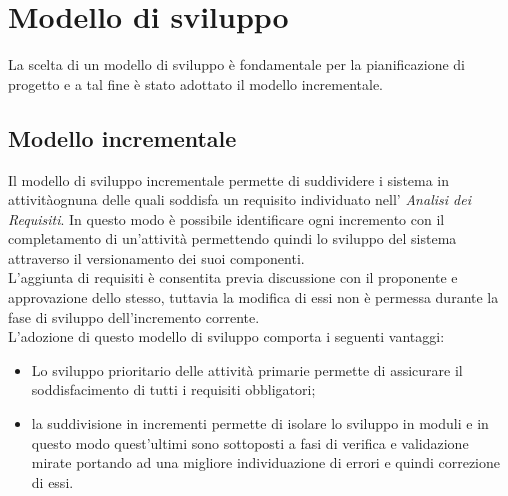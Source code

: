 \section{Modello di sviluppo}
La scelta di un modello di sviluppo è fondamentale per la pianificazione di 
progetto e a tal fine è stato adottato il modello incrementale.
\subsection{Modello incrementale}
Il modello di sviluppo incrementale permette di suddividere i sistema in 
attività\glosp ognuna delle quali soddisfa un requisito\glosp 
individuato nell' \textit{Analisi dei Requisiti}. In questo modo è possibile 
identificare ogni incremento con il completamento di un'attività permettendo 
quindi lo sviluppo del sistema attraverso il versionamento dei suoi componenti. 
\\
L'aggiunta di requisiti è consentita previa discussione con il proponente e 
approvazione dello stesso, tuttavia la modifica di essi non è permessa 
durante la fase di sviluppo dell'incremento corrente.\\
L'adozione di questo modello di sviluppo comporta i seguenti vantaggi:
\begin{itemize}
	\item Lo sviluppo prioritario delle attività primarie permette di 
	assicurare il soddisfacimento di tutti i requisiti obbligatori;
	\item la suddivisione in incrementi permette di isolare lo sviluppo in 
	moduli e in questo modo quest'ultimi sono sottoposti a fasi di verifica e 
	validazione mirate portando ad una migliore individuazione di errori e 
	quindi correzione di essi.
\end{itemize}

